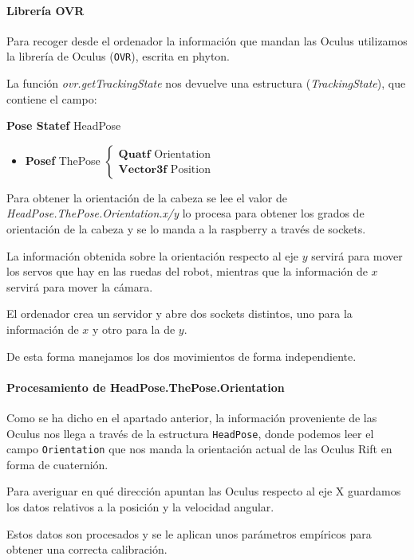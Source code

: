 \documentclass[twoside, 12pt]{epstfg}
\begin{document}
\paragraph{Librería OVR}
Para recoger desde el ordenador la información que mandan las Oculus utilizamos la librería de Oculus (\texttt{OVR}), escrita en phyton.

La función \textit{ovr.getTrackingState} nos devuelve una estructura (\textit{TrackingState}), que contiene el campo:

\textbf{Pose Statef} HeadPose 
\begin{itemize}
	\item \textbf{Posef} ThePose $\begin{cases}
	\textbf{Quatf} \text{ Orientation}\\
	\textbf{Vector3f}\text{ Position} 
	\end{cases}$
	
	
\end{itemize}

Para obtener la orientación de la cabeza se lee el valor de \textit{HeadPose.ThePose.Orientation.x/y} lo procesa para obtener los grados de orientación de la cabeza y se lo manda a la raspberry a través de sockets.

La información obtenida sobre la orientación respecto al eje $y$ servirá para mover los servos que hay en las ruedas del robot, mientras que la información de $x$ servirá para mover la cámara.


El ordenador crea un servidor y abre dos sockets distintos, uno para la información de $x$ y otro para la de $y$.


De esta forma manejamos los dos movimientos de forma independiente.


\paragraph{Procesamiento de HeadPose.ThePose.Orientation}

Como se ha dicho en el apartado anterior, la información proveniente de las Oculus nos llega a través de la estructura \texttt{HeadPose}, donde podemos leer el campo \texttt{Orientation} que nos manda la orientación actual de las Oculus Rift en forma de cuaternión.

Para averiguar en qué dirección apuntan las Oculus respecto al eje X guardamos los datos relativos a la posición y la velocidad angular.

 Estos datos son procesados y se le aplican unos parámetros empíricos para obtener una correcta calibración.
\end{document}
